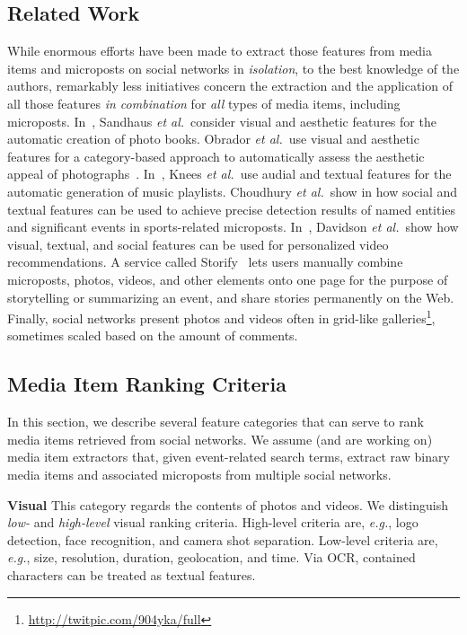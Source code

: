 \subsection{Related Work}
While enormous efforts have been made to extract those features
from media items and microposts on social networks in \emph{isolation},
to the best knowledge of the authors, remarkably less initiatives 
concern the extraction and the application
of all those features \emph{in combination}
for \emph{all} types of media items, including microposts.
In~\cite{Photo2011}, Sandhaus \emph{et al.}\ consider visual and
aesthetic features for the automatic creation of photo books.
Obrador \emph{et al.}\ use visual and aesthetic features
for a category-based approach to automatically assess
the aesthetic appeal of photographs~\cite{Photo2012}.
In~\cite{Playlist2006}, Knees \emph{et al.}\ use audial and textual
features for the automatic generation of music playlists.
Choudhury \emph{et al.}\ show in \cite{Sports2011} how social and textual
features can be used to achieve precise detection results 
of named entities and significant events in sports-related microposts.
In~\cite{YouTube2010}, Davidson \emph{et al.}\ show how visual,
textual, and social features can be used for personalized video recommendations.
A service called Storify~\cite{Storify2011} lets users manually combine
microposts, photos, videos, and other elements onto one page for the purpose
of storytelling or summarizing an event,
and share stories permanently on the Web.
Finally, social networks present photos and videos
often in grid-like galleries\footnote{\url{http://twitpic.com/904yka/full}}, sometimes scaled
based on the amount of comments.

\subsection{Media Item Ranking Criteria}
In this section, we describe several feature categories that can serve to rank
media items retrieved from social networks. 
We assume (and are working on) media item extractors that,
given event-related search terms,
extract raw binary media items and associated microposts
from multiple social networks.

\noindent \textbf{Visual}
This category regards the contents of photos and videos.
We distinguish \emph{low-} and \emph{high-level} visual ranking criteria.
High-level criteria are, \emph{e.g.}, logo detection,
face recognition, and camera shot separation.
Low-level criteria are, \emph{e.g.}, size, resolution,
duration, geolocation, and time.
Via OCR, contained characters can be treated as textual features.


